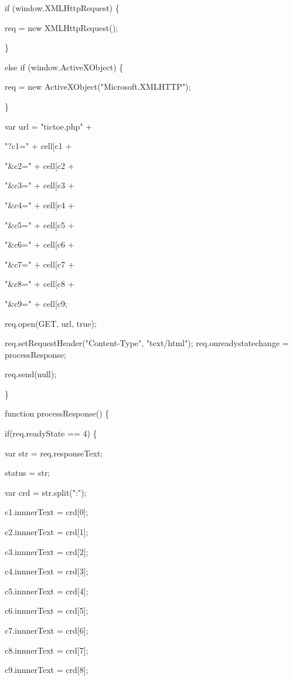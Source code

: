 \documentclass[
]{article}
\begin{document}
if (window.XMLHttpRequest) \{

req = new XMLHttpRequest();

\}

else if (window.ActiveXObject) \{

req = new ActiveXObject("Microsoft.XMLHTTP");

\}

var url = "tictoe.php" +

"?c1=" + cell{[}\textquotesingle c1\textquotesingle{]} +

"\&c2=" + cell{[}\textquotesingle c2\textquotesingle{]} +

"\&c3=" + cell{[}\textquotesingle c3\textquotesingle{]} +

"\&c4=" + cell{[}\textquotesingle c4\textquotesingle{]} +

"\&c5=" + cell{[}\textquotesingle c5\textquotesingle{]} +

"\&c6=" + cell{[}\textquotesingle c6\textquotesingle{]} +

"\&c7=" + cell{[}\textquotesingle c7\textquotesingle{]} +

"\&c8=" + cell{[}\textquotesingle c8\textquotesingle{]} +

"\&c9=" + cell{[}\textquotesingle c9\textquotesingle{]};

req.open(\textquotesingle GET\textquotesingle, url, true);

req.setRequestHeader("Content-Type", "text/html");
req.onreadystatechange = processResponse;

req.send(null);

\}

function processResponse() \{

if(req.readyState == 4) \{

var str = req.responseText;

status = str;

var crd = str.split(":");

c1.innnerText = crd{[}0{]};

c2.innnerText = crd{[}1{]};

c3.innnerText = crd{[}2{]};

c4.innnerText = crd{[}3{]};

c5.innnerText = crd{[}4{]};

c6.innnerText = crd{[}5{]};

c7.innnerText = crd{[}6{]};

c8.innnerText = crd{[}7{]};

c9.innnerText = crd{[}8{]};
\end{document}

